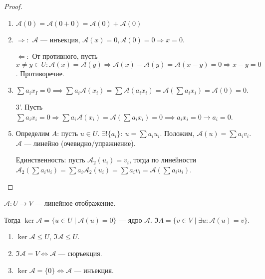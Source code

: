 \begin{proof}
     \begin{enumerate}
         \item $\mathcal{A}(0) = \mathcal{A}(0+0) = \mathcal{A}(0) + \mathcal{A}(0)$ 
         \item $\Rightarrow\!:$  $\mathcal{A}$ --- инъекция,  $\mathcal{A}(x) = 0, \mathcal{A}(0)=0 \Rightarrow x = 0$. 

             $\Leftarrow\!:$ От противного, пусть $x \neq y \in U : \mathcal{A}(x) = \mathcal{A}(y) \Rightarrow \mathcal{A}(x) - \mathcal{A}(y) = \mathcal{A}(x - y) = 0 \Rightarrow x - y = 0$. Противоречие.
         \item  $\sum a_i x_I = 0 \implies \sum a_i \mathcal{A}(x_i) = \sum \mathcal{A}(a_i x_i) = \mathcal{A}(\sum a_i x_i) = \mathcal{A}(0) = 0$.
         \item[3'.] Пусть $\sum a_i x_i = 0 \Rightarrow \sum a_i \mathcal{A}(x_i) = \mathcal{A}(\sum a_i x_i) = 0 \implies a_i x_i = 0 \rightarrow a_i = 0$.
         \item Определим $A$: пусть  $u \in U$.  $\exists! \{a_i\}\!:\ u = \sum a_i u_i$. Положим,  $\mathcal{A}(u) = \sum a_i v_i$.  $\mathcal{A}$ --- линейно (очевидно/упражнение).

             Единственность: пусть  $\mathcal{A}_2(u_i) = v_i$, тогда  по линейности  $\mathcal{A}_2(\sum a_i u_i) = \sum a_i \mathcal{A}_2(u_i) = \sum a_i v_i = \mathcal{A}(\sum a_i u_i)$.
    \end{enumerate}
\end{proof}
\begin{definition}
    $\mathcal{A}\!: U \to V$ --- линейное отображение.

    Тогда  $\ker \mathcal{A} = \{ u \in U \mid \mathcal{A}(u) = 0\}$ --- ядро  $\mathcal{A}$.  $\Im A = \{ v \in V \mid \exists u: \mathcal{A}(u) = v\}$.
\end{definition}
\begin{properties}
    \begin{enumerate}
        \item $\ker \mathcal{A} \le U$, $\Im \mathcal{A} \le U$.
        \item $\Im \mathcal{A} = V \iff \mathcal{A}$ --- сюръекция.
        \item $\ker \mathcal{A} = \{0\} \iff \mathcal{A}$ --- инъекция.
    \end{enumerate}
\end{properties}
